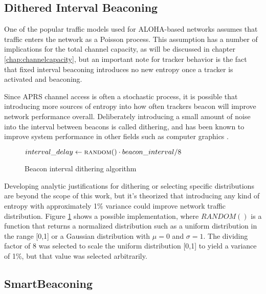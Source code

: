 \subsection{Dithered Interval Beaconing}

One of the popular traffic models used for ALOHA-based networks assumes
that traffic enters the network as a Poisson process. 
This assumption has a number of implications for the total channel capacity, 
as will be discussed in chapter \ref{chap:channelcapacity},
but an important note for tracker behavior is the fact that fixed interval
beaconing introduces no new entropy once a tracker is activated and beaconing.

Since APRS channel access is often a stochastic process,
it is possible that introducing more sources of entropy into
how often trackers beacon will improve network performance overall.
Deliberately introducing a small amount of noise into the interval between
beacons is called dithering,
and has been known to improve system performance
in other fields such as computer graphics \cite{robertsdither}.

\begin{figure}
\begin{algorithmic}
\State $interval\_delay \gets \Call{random}{ } \cdot beacon\_interval / 8$
	\State {}
	\State {}

\EndWhile
\end{algorithmic}
\caption{Beacon interval dithering algorithm}
\label{fig:ditheringalg}
\end{figure}

Developing analytic justifications for dithering or selecting specific distributions
are beyond the scope of this work, but it's theorized that introducing
any kind of entropy with approximately 1\% variance could improve network
traffic distribution.
Figure \ref{fig:ditheringalg} shows a possible implementation, where $RANDOM()$
is a function that returns a normalized distribution such as 
a uniform distribution in the range [0,1] 
or a Gaussian distribution with $\mu=0$ and $\sigma=1$.
The dividing factor of 8 was selected to scale the uniform distribution [0,1]
to yield a variance of 1\%, but that value was selected arbitrarily.

\subsection{SmartBeaconing}

